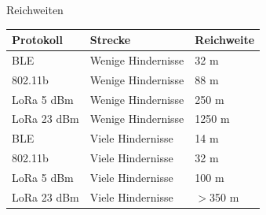 \documentclass[18pt]{beamer}
\begin{document}
\begin{frame}{Reichweiten}
	\centering
	\begin{tabular}{l|l|l}
		Protokoll & Strecke & Reichweite \\
		\hline
		BLE & Wenige Hindernisse & 32 m \\
		802.11b & Wenige Hindernisse & 88 m \\
		LoRa 5 dBm & Wenige Hindernisse & 250 m \\
		LoRa 23 dBm & Wenige Hindernisse & 1250 m \\
		\hline
		\pause
		BLE & Viele Hindernisse & 14 m \\
		802.11b & Viele Hindernisse & 32 m \\
		LoRa 5 dBm & Viele Hindernisse & 100 m \\
		LoRa 23 dBm & Viele Hindernisse & $>$350 m \\
	\end{tabular}\\
\end{frame}
\end{document}
